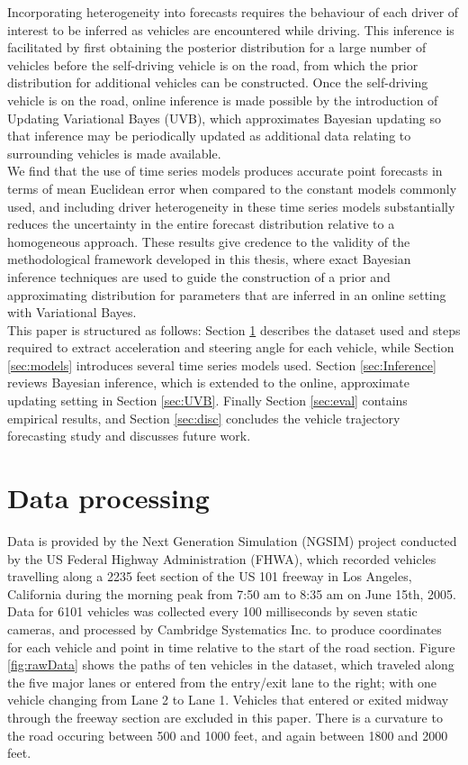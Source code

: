 \documentclass[12pt,a4paper]{article}\usepackage[]{graphicx}\usepackage[]{color}
\begin{document}
Incorporating heterogeneity into forecasts requires the behaviour of each driver of interest to be inferred as vehicles are encountered while driving. This inference is facilitated by first obtaining the posterior distribution for a large number of vehicles before the self-driving vehicle is on the road, from which the prior distribution for additional vehicles can be constructed. Once the self-driving vehicle is on the road, online inference is made possible by the introduction of Updating Variational Bayes (UVB), which approximates Bayesian updating so that inference may be periodically updated as additional data relating to surrounding vehicles is made available. 
\\

We find that the use of time series models produces accurate point forecasts in terms of mean Euclidean error when compared to the constant models commonly used, and including driver heterogeneity in these time series models substantially reduces the uncertainty in the entire forecast distribution relative to a homogeneous approach. These results give credence to the validity of the methodological framework developed in this thesis, where exact Bayesian inference techniques are used to guide the construction of a prior and approximating distribution for parameters that are inferred in an online setting with Variational Bayes.
\\

This paper is structured as follows: Section \ref{sec:dataProcessing} describes the dataset used and steps required to extract acceleration and steering angle for each vehicle, while Section \ref{sec:models} introduces several time series models used. Section \ref{sec:Inference} reviews Bayesian inference, which is extended to the online, approximate updating setting in Section \ref{sec:UVB}. Finally Section \ref{sec:eval} contains empirical results, and Section \ref{sec:disc} concludes the vehicle trajectory forecasting study and discusses future work.

\section{Data processing}
\label{sec:dataProcessing}
Data is provided by the Next Generation Simulation (NGSIM) project conducted by the US Federal Highway Administration (FHWA), which recorded vehicles travelling along a 2235 feet section of the US 101 freeway in Los Angeles, California during the morning peak from 7:50 am to 8:35 am on June 15th, 2005. Data for 6101 vehicles was collected every 100 milliseconds by seven static cameras, and processed by Cambridge Systematics Inc. to produce coordinates for each vehicle and point in time relative to the start of the road section. 
Figure \ref{fig:rawData} shows the paths of ten vehicles in the dataset, which traveled along the five major lanes or entered from the entry/exit lane to the right; with one vehicle changing from Lane 2 to Lane 1. Vehicles that entered or exited midway through the freeway section are excluded in this paper. There is a curvature to the road occuring between 500 and 1000 feet, and again between 1800 and 2000 feet.
\\
\end{document}
